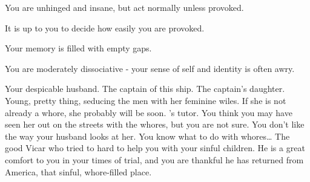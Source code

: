 \documentclass[char]{airship}
\begin{document}
\begin{itemz}[Notes]
  \item You are unhinged and insane, but act normally unless provoked.
  \item It is up to you to decide how easily you are provoked.
  \item Your memory is filled with empty gaps.
  \item You are moderately dissociative - your sense of self and identity is often awry.
\end{itemz}


\begin{contacts}
  \contact{\cNoble{}} Your despicable husband.
  \contact{\cCaptain{}} The captain of this ship.
  \contact{\cThief{}} The captain's daughter. Young, pretty thing, seducing the men with her feminine wiles. If she is not already a whore, she probably will be soon.
  \contact{\cWhore{}} \cThief{}'s tutor. You think you may have seen her out on the streets with the whores, but you are not sure. You don't like the way your husband looks at her. You know what to do with whores{\ldots} 
  \contact{\cVicar{}} The good Vicar who tried to hard to help you with your sinful children. He is a great comfort to you in your times of trial, and you are thankful he has returned from America, that sinful, whore-filled place.
\end{contacts}
\end{document}
